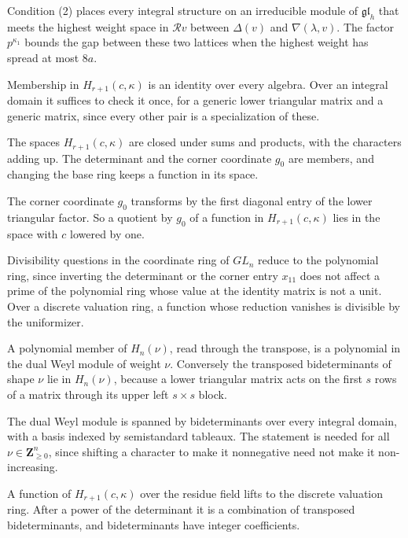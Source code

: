 Condition (2) places every integral structure on an irreducible module of $\mathfrak{gl}_h$ that meets
the highest weight space in $\mathcal Rv$ between $\Delta(v)$ and $\nabla(\lambda,v)$. The factor
$p^{\kappa_1}$ bounds the gap between these two lattices when the highest weight has spread at most $8a$.

Membership in $H_{r+1}(c,\kappa)$ is an identity over every algebra. Over an integral domain it suffices
to check it once, for a generic lower triangular matrix and a generic matrix, since every other pair is
a specialization of these.

The spaces $H_{r+1}(c,\kappa)$ are closed under sums and products, with the characters adding up. The
determinant and the corner coordinate $g_0$ are members, and changing the base ring keeps a function in
its space.

The corner coordinate $g_0$ transforms by the first diagonal entry of the lower triangular factor. So a
quotient by $g_0$ of a function in $H_{r+1}(c,\kappa)$ lies in the space with $c$ lowered by one.

Divisibility questions in the coordinate ring of $GL_n$ reduce to the polynomial ring, since inverting the
determinant or the corner entry $x_{11}$ does not affect a prime of the polynomial ring whose value at the
identity matrix is not a unit. Over a discrete valuation ring, a function whose reduction vanishes is divisible by the
uniformizer.

A polynomial member of $H_n(\nu)$, read through the transpose, is a polynomial in the dual Weyl module of
weight $\nu$. Conversely the transposed bideterminants of shape $\nu$ lie in $H_n(\nu)$, because a lower
triangular matrix acts on the first $s$ rows of a matrix through its upper left $s\times s$ block.

The dual Weyl module is spanned by bideterminants over every integral domain, with a basis indexed by
semistandard tableaux. The statement is needed for all $\nu\in\mathbf Z^n_{\geq0}$, since shifting a character
to make it nonnegative need not make it non-increasing.

A function of $H_{r+1}(c,\kappa)$ over the residue field lifts to the discrete valuation ring. After a power
of the determinant it is a combination of transposed bideterminants, and bideterminants have integer
coefficients.

